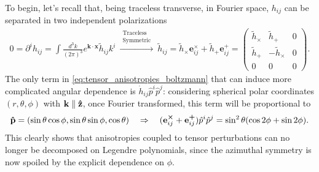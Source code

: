 To begin, let's recall that, being traceless transverse, in Fourier space, $h_{ij}$ can be separated in two independent polarizations
\begin{align*}
    0=\partial^ih_{ij}=\int\frac{d^3k}{(2\pi)^3}e^{\mathbf{k}\cdot\mathbf{x}}\tilde h_{ij}k^i \ \xrightarrow{\substack{\text{Traceless}\\\text{Symmetric}}}\ \tilde h_{ij}=\tilde h_{\boldsymbol \times} \mathbf{e}_{ij}^{\boldsymbol \times}+\tilde h_{\boldsymbol +} \mathbf{e}_{ij}^{\boldsymbol +}=
    \begin{pmatrix}
        \tilde h_{\boldsymbol \times} & \tilde h_{\boldsymbol +} & 0\\
        \tilde h_{\boldsymbol +} & -\tilde h_{\boldsymbol \times} & 0\\
        0&0&0
    \end{pmatrix}.
\end{align*}
The only term in \eqref{eq:tensor_anisotropies_boltzmann} that can induce more complicated angular dependence is $\dot{h}_{ij}\hat p^i\hat p^j$: considering spherical polar coordinates $(r,\theta,\phi)$ with $\mathbf k\parallel \mathbf{\hat{z}}$, once Fourier transformed, this term will be proportional to
\begin{align*}
    \mathbf{\hat{p}}=(\sin\theta\cos\phi,\sin\theta\sin\phi,\cos\theta)\quad \Rightarrow\quad (\mathbf{e}_{ij}^{\boldsymbol \times}+\mathbf{e}_{ij}^{\boldsymbol +})\hat p^i\hat p^j=\sin^2\theta(\cos2\phi+\sin2\phi).
\end{align*} 
This clearly shows that anisotropies coupled to tensor perturbations can no longer be decomposed on Legendre polynomials, since the azimuthal symmetry is now spoiled by the explicit dependence on $\phi$.

